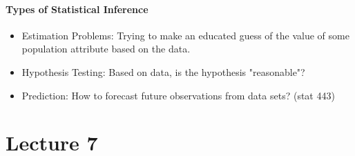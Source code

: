 \documentclass[10pt,letter]{article}
\theoremstyle{plain}
\theoremstyle{definition}
\begin{document}
\paragraph{Types of Statistical Inference}
\begin{itemize}
\item Estimation Problems: Trying to make an educated guess of the value of some population attribute based on the data.
\item Hypothesis Testing: Based on data, is the hypothesis "reasonable"? 
\item Prediction: How to forecast future observations from data sets? (stat 443)
\end{itemize}


\section*{Lecture 7}
\end{document}
